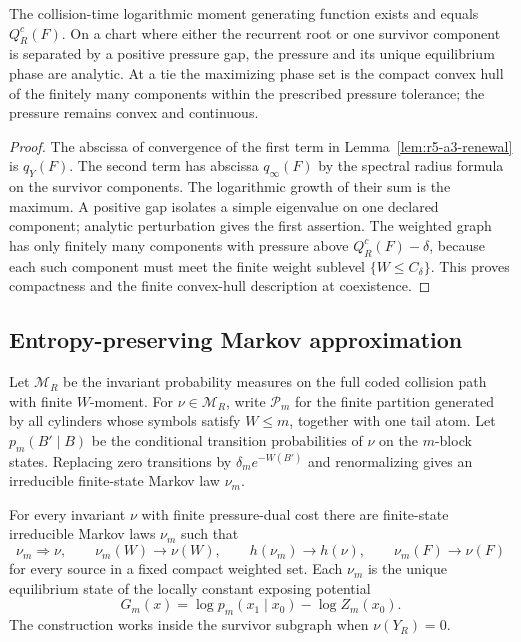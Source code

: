 \begin{theorem}
\label{thm:r5-a3-pressure}
The collision-time logarithmic moment generating function exists and equals
\(Q_R^c(F)\).  On a chart where either the recurrent root or one survivor
component is separated by a positive pressure gap, the pressure and its
unique equilibrium phase are analytic.  At a tie the maximizing phase set is
the compact convex hull of the finitely many components within the prescribed
pressure tolerance; the pressure remains convex and continuous.
\end{theorem}

\begin{proof}
The abscissa of convergence of the first term in
Lemma~\ref{lem:r5-a3-renewal} is \(q_Y(F)\).  The second term has abscissa
\(q_\infty(F)\) by the spectral radius formula on the survivor components.
The logarithmic growth of their sum is the maximum.  A positive gap isolates
a simple eigenvalue on one declared component; analytic perturbation gives the
first assertion.  The weighted graph has only finitely many components with
pressure above \(Q_R^c(F)-\delta\), because each such component must meet the
finite weight sublevel \(\{W\le C_\delta\}\).  This proves compactness and the
finite convex-hull description at coexistence.
\end{proof}

\subsection{Entropy-preserving Markov approximation}

Let \(\mathcal M_R\) be the invariant probability measures on the full coded
collision path with finite \(W\)-moment.  For \(\nu\in\mathcal M_R\), write
\(\mathcal P_m\) for the finite partition generated by all cylinders whose
symbols satisfy \(W\le m\), together with one tail atom.  Let
\(p_m(B'\mid B)\) be the conditional transition probabilities of \(\nu\)
on the \(m\)-block states.  Replacing zero transitions by
\(\delta_m e^{-W(B')}\) and renormalizing gives an irreducible finite-state
Markov law \(\nu_m\).

\begin{lemma}
\label{lem:r5-a3-density}
For every invariant \(\nu\) with finite pressure-dual cost there are
finite-state irreducible Markov laws \(\nu_m\) such that
\[
 \nu_m\Rightarrow\nu,\qquad
 \nu_m(W)\to\nu(W),\qquad
 h(\nu_m)\to h(\nu),\qquad
 \nu_m(F)\to\nu(F)
\]
for every source in a fixed compact weighted set.  Each \(\nu_m\) is the
unique equilibrium state of the locally constant exposing potential
\[
 G_m(x)=\log p_m(x_1\mid x_0)-\log Z_m(x_0).
\]
The construction works inside the survivor subgraph when \(\nu(Y_R)=0\).
\end{lemma}

